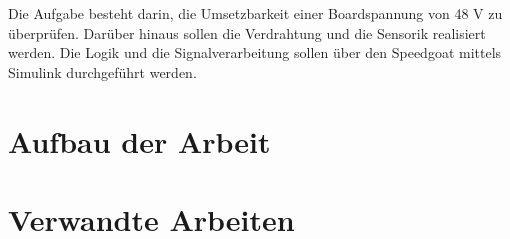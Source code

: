 Die Aufgabe besteht darin, die Umsetzbarkeit einer Boardspannung von 48 V zu überprüfen. Darüber hinaus sollen die Verdrahtung und die Sensorik realisiert werden. Die Logik und die Signalverarbeitung sollen über den Speedgoat mittels Simulink durchgeführt werden.

\section{Aufbau der Arbeit}

\section{Verwandte Arbeiten}

\pagebreak

